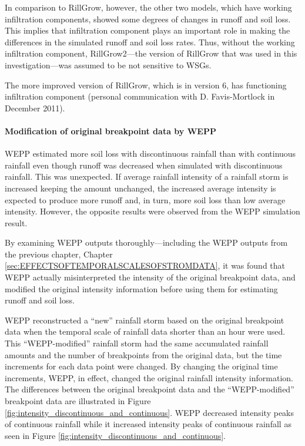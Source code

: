 In comparison to RillGrow, however, the other two models, which have working
infiltration components, showed some degrees of changes in runoff and soil loss.
This implies that infiltration component plays an important role in making the
differences in the simulated runoff and soil loss rates. Thus, without the
working infiltration component, RillGrow2---the version of RillGrow that was
used in this investigation---was assumed to be not sensitive to WSGs.

The more improved version of RillGrow, which is in version 6, has functioning
infiltration component (personal communication with D. Favis-Mortlock in
December 2011).

\paragraph{Modification of original breakpoint data by WEPP} WEPP estimated more
soil loss with discontinuous rainfall than with continuous rainfall even though
runoff was decreased when simulated with discontinuous rainfall. This was
unexpected. If average rainfall intensity of a rainfall storm is
increased keeping the amount unchanged, the increased average intensity is
expected to produce more runoff and, in turn, more soil loss than low average
intensity. However, the opposite results were observed from the WEPP simulation
result.

By examining WEPP outputs thoroughly---including the WEPP outputs from
the previous chapter, Chapter \ref{sec:EFFECTSOFTEMPORALSCALESOFSTROMDATA}, it
was found that WEPP actually misinterpreted the intensity of the original
breakpoint data, and modified the original intensity
information before using them for estimating runoff and soil loss.

WEPP reconstructed a ``new'' rainfall storm based on the original breakpoint
data when the temporal scale of rainfall data shorter than an hour were used.
This ``WEPP-modified'' rainfall storm had the same accumulated rainfall
amounts and the number of breakpoints from the original data, but the time
increments for each data point were changed. By changing the original time
increments, WEPP, in effect, changed the original rainfall intensity
information. The differences between the original breakpoint data and the
``WEPP-modified'' breakpoint data are illustrated in Figure
\ref{fig:intensity_discontinuous_and_continuous}. WEPP decreased intensity peaks
of continuous rainfall while it increased intensity peaks of continuous rainfall
as seen in Figure \ref{fig:intensity_discontinuous_and_continuous}.

